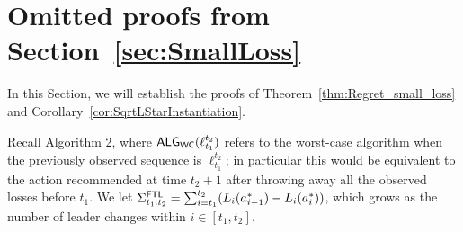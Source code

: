 

    







\section{Omitted proofs from Section~\ref{sec:SmallLoss}} \label{appendix:smallLossPf}
In this Section, we will establish the proofs of Theorem~\ref{thm:Regret_small_loss} and Corollary~\ref{cor:SqrtLStarInstantiation}. 

Recall Algorithm 2, where $\mathsf{ALG}_{\mathsf{WC}}(\ell_{t_1}^{t_2})$ refers to the worst-case algorithm when the previously observed sequence is $\ell_{t_1}^{t_2}$; in particular this would be equivalent to the action recommended at time $t_2 + 1$ after throwing away all the observed losses before $t_1$. 
We let $\Sigma^{\mathsf{FTL}}_{t_1:t_2} = 
\sum_{i=t_1}^{t_2} (L_i(a^*_{i-1}) - L_i(a^*_i))$, which grows as the number of leader changes within $i \in [t_1, t_2]$.

